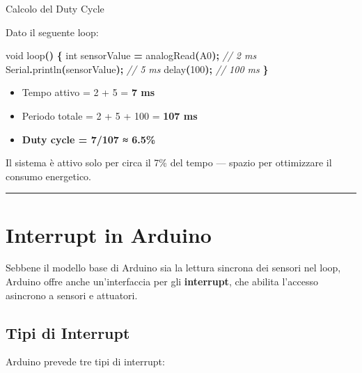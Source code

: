 \documentclass[
  italian,
  openany]{book}
\newenvironment{Shaded}{\begin{snugshade}}{\end{snugshade}}
\newcommand{\CommentTok}[1]{\textcolor[rgb]{0.56,0.35,0.01}{\textit{#1}}}
\newcommand{\DataTypeTok}[1]{\textcolor[rgb]{0.13,0.29,0.53}{#1}}
\newcommand{\DecValTok}[1]{\textcolor[rgb]{0.00,0.00,0.81}{#1}}
\newcommand{\NormalTok}[1]{#1}
\newcommand{\OperatorTok}[1]{\textcolor[rgb]{0.81,0.36,0.00}{\textbf{#1}}}
\providecommand{\tightlist}{%
  \setlength{\itemsep}{0pt}\setlength{\parskip}{0pt}}
\begin{document}
\begin{callouttip}{Calcolo del Duty Cycle}

Dato il seguente loop:

\begin{Shaded}
\begin{Highlighting}[]
\DataTypeTok{void}\NormalTok{ loop}\OperatorTok{()} \OperatorTok{\{}
  \DataTypeTok{int}\NormalTok{ sensorValue }\OperatorTok{=}\NormalTok{ analogRead}\OperatorTok{(}\NormalTok{A0}\OperatorTok{);}  \CommentTok{// 2 ms}
\NormalTok{  Serial}\OperatorTok{.}\NormalTok{println}\OperatorTok{(}\NormalTok{sensorValue}\OperatorTok{);}       \CommentTok{// 5 ms}
\NormalTok{  delay}\OperatorTok{(}\DecValTok{100}\OperatorTok{);}                        \CommentTok{// 100 ms}
\OperatorTok{\}}
\end{Highlighting}
\end{Shaded}

\begin{itemize}
\tightlist
\item
  Tempo attivo = 2 + 5 = \textbf{7 ms}
\item
  Periodo totale = 2 + 5 + 100 = \textbf{107 ms}
\item
  \textbf{Duty cycle = 7/107 ≈ 6.5\%}
\end{itemize}

Il sistema è attivo solo per circa il 7\% del tempo --- spazio per
ottimizzare il consumo energetico.

\end{callouttip}

\begin{center}\rule{0.5\linewidth}{0.5pt}\end{center}

\section{Interrupt in Arduino}\label{interrupt-in-arduino}

Sebbene il modello base di Arduino sia la lettura sincrona dei sensori
nel loop, Arduino offre anche un'interfaccia per gli \textbf{interrupt},
che abilita l'accesso asincrono a sensori e attuatori.

\subsection{Tipi di Interrupt}\label{tipi-di-interrupt}

Arduino prevede tre tipi di interrupt:
\end{document}
